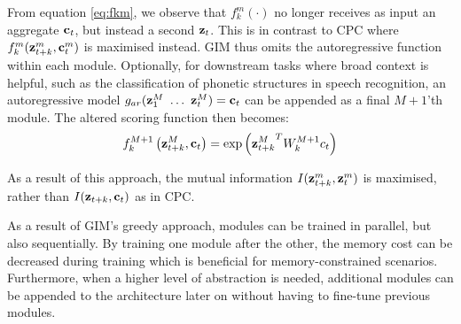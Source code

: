 		From equation \ref{eq:fkm}, we observe that $f_k^m( \cdot )$ no longer receives as input an aggregate $\mathbf{c}_t$, but instead a second $\mathbf{z}_t$. This is in contrast to CPC where $f_k^m(\mathbf{z}_{t+k}^m,\mathbf{c}_t^m)$ is maximised instead. GIM thus omits the autoregressive function within each module. Optionally, for downstream tasks where broad context is helpful, such as the classification of phonetic structures in speech recognition, an autoregressive model $g_{ar}(\mathbf{z}_1^M ~ \dots ~ \mathbf{z}_t^M) = \mathbf{c}_t$ can be appended as a final $M+1$'th module. The altered scoring function then becomes:
		$$
		f_k^{M+1}\left(\mathbf{z}_{t+k}^M, \mathbf{c}_t \right)=\exp \left({\mathbf{z}_{t+k}^M}^T W_k^{M+1} c_t \right)
		$$

			As a result of this approach, the mutual information $I(\mathbf{z}_{t+k}^m,\mathbf{z}_t^m)$ is maximised, rather than $I(\mathbf{z}_{t+k}, \mathbf{c}_t)$ as in CPC. %
		
			As a result of GIM's greedy approach, modules can be trained in parallel, but also sequentially. By training one module after the other, the memory cost can be decreased during training which is beneficial for memory-constrained scenarios. Furthermore, when a higher level of abstraction is needed, additional modules can be appended to the architecture later on without having to fine-tune previous modules.

	

